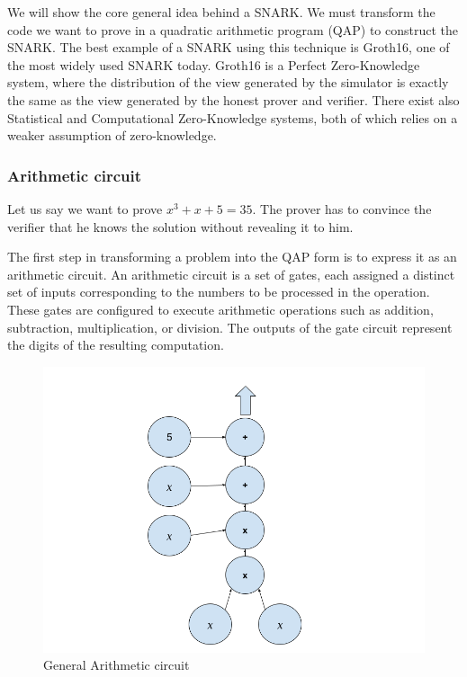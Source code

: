  We will show the core general idea behind a SNARK. 
We must transform the code we want to prove in a quadratic arithmetic program (QAP) to construct the SNARK.
The best example of a SNARK using this technique is Groth16\cite{GR16}, one of the most widely used SNARK today.
Groth16 is a Perfect Zero-Knowledge system, where the distribution of the view generated by the simulator is exactly the same as the view generated by the honest prover and verifier. 
There exist also Statistical and Computational Zero-Knowledge systems, both of which relies on a weaker assumption of zero-knowledge. 


\subsubsection{Arithmetic circuit}
\label{subsec:ac}

Let us say we want to prove $x^3+x+5=35$.
The prover has to convince the verifier that he knows the solution without revealing it to him.

The first step in transforming a problem into the QAP form is to express it as an arithmetic circuit.
An arithmetic circuit is a set of gates, each assigned a distinct set of inputs corresponding to the numbers to be processed in the operation.
These gates are configured to execute arithmetic operations such as addition, subtraction, multiplication, or division. The outputs of the gate circuit represent the digits of the resulting computation.

\begin{figure}[H]
\centering
\includegraphics[width=130mm]{ArithmeticCircuit.png}
\caption{General Arithmetic circuit}
\label{overflow}
\end{figure}

